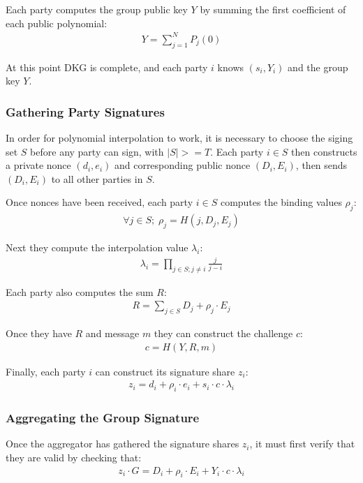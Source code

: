 \documentclass{article}
\begin{document}
Each party computes the group public key $Y$ by summing the first coefficient of each public polynomial:
\begin{align}
  Y = \sum_{j=1}^{N} P_j(0)
\end{align}

At this point DKG is complete, and each party $i$ knows $(s_i, Y_i)$ and the group key $Y$.

\newpage
\onecolumn
\subsubsection{
  Gathering Party Signatures
}

In order for polynomial interpolation to work, it is necessary to choose the siging set $S$ before any party can sign, with $|S| >= T$.  Each party $i \in S$ then constructs a private nonce $(d_i,e_i)$ and corresponding public nonce $(D_i,E_i)$, then sends $(D_i,E_i)$ to all other parties in $S$.

Once nonces have been received, each party $i \in S$ computes the binding values $\rho_j$:
\begin{align}
  \forall j \in S;\;\rho_j = H(j, D_j, E_j)
\end{align}

Next they compute the interpolation value $\lambda_i$:
\begin{align}
  \lambda_i = \prod_{j \in S; j \neq i}^{} \frac{j}{j - i}
\end{align}

Each party also computes the sum $R$:
\begin{align}
  R = \sum_{j \in S}^{} D_j + \rho_j \cdot E_j
\end{align}

Once they have $R$ and message $m$ they can construct the challenge $c$:
\begin{align}
  c = H(Y, R, m)
\end{align}

Finally, each party $i$ can construct its signature share $z_i$:
\begin{align}
  z_i = d_i + \rho_i \cdot e_i + s_i \cdot c \cdot \lambda_i
\end{align}


\subsubsection{
  Aggregating the Group Signature
}

Once the aggregator has gathered the signature shares $z_i$, it must first verify that they are valid by checking that:
\begin{align}
  z_i \cdot G = D_i + \rho_i \cdot E_i + Y_i \cdot c \cdot \lambda_i
\end{align}
\end{document}
